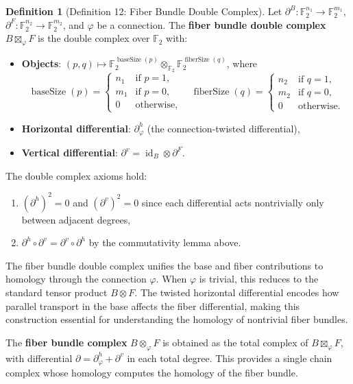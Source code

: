 \documentclass[11pt]{article}
\theoremstyle{plain}
\theoremstyle{definition}
\newtheorem*{definition}{Definition}
\theoremstyle{remark}
\begin{document}
\begin{definition}[Definition 12: Fiber Bundle Double Complex]
Let $\partial^B : \mathbb{F}_2^{n_1} \to \mathbb{F}_2^{m_1}$, $\partial^F : \mathbb{F}_2^{n_2} \to \mathbb{F}_2^{m_2}$, and $\varphi$ be a connection. The \textbf{fiber bundle double complex} $B \boxtimes_\varphi F$ is the double complex over $\mathbb{F}_2$ with:
\begin{itemize}
  \item \textbf{Objects}: $(p, q) \mapsto \mathbb{F}_2^{\operatorname{baseSize}(p)} \otimes_{\mathbb{F}_2} \mathbb{F}_2^{\operatorname{fiberSize}(q)}$, where
  \[
    \operatorname{baseSize}(p) = \begin{cases} n_1 & \text{if } p = 1, \\ m_1 & \text{if } p = 0, \\ 0 & \text{otherwise,} \end{cases}
    \quad
    \operatorname{fiberSize}(q) = \begin{cases} n_2 & \text{if } q = 1, \\ m_2 & \text{if } q = 0, \\ 0 & \text{otherwise.} \end{cases}
  \]
  \item \textbf{Horizontal differential}: $\partial^h_\varphi$ (the connection-twisted differential),
  \item \textbf{Vertical differential}: $\partial^v = \operatorname{id}_B \otimes \partial^F$.
\end{itemize}
The double complex axioms hold:
\begin{enumerate}
  \item $(\partial^h)^2 = 0$ and $(\partial^v)^2 = 0$ since each differential acts nontrivially only between adjacent degrees,
  \item $\partial^h \circ \partial^v = \partial^v \circ \partial^h$ by the commutativity lemma above.
\end{enumerate}
\end{definition}

The fiber bundle double complex unifies the base and fiber contributions to homology through the connection $\varphi$. When $\varphi$ is trivial, this reduces to the standard tensor product $B \otimes F$. The twisted horizontal differential encodes how parallel transport in the base affects the fiber differential, making this construction essential for understanding the homology of nontrivial fiber bundles.

The \textbf{fiber bundle complex} $B \otimes_\varphi F$ is obtained as the total complex of $B \boxtimes_\varphi F$, with differential $\partial = \partial^h_\varphi + \partial^v$ in each total degree. This provides a single chain complex whose homology computes the homology of the fiber bundle.
\end{document}
